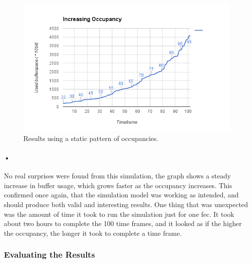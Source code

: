 \documentclass[a4paper, 12pt]{report}
\begin{document}
\begin{figure}[h!]
	\centering
		\includegraphics[width=1.0\textwidth]{images/increasing-occ.png}
		\caption{Results using a static pattern of occupancies.}
		\label{fig:increasing-occ}
\end{figure}

\paragraph{•} %
No real surprises were found from this simulation, the graph shows a steady increase in buffer usage, which grows faster as the occupancy increases.
This confirmed once again, that the simulation model was working as intended, and should produce both valid and interesting results.
One thing that was unexpected was the amount of time it took to run the simulation just for one \gls{fec}.
It took about two hours to complete the 100 time frames, and it looked as if the higher the occupancy, the longer it took to complete a time frame.

\subsubsection{Evaluating the Results}
\end{document}
